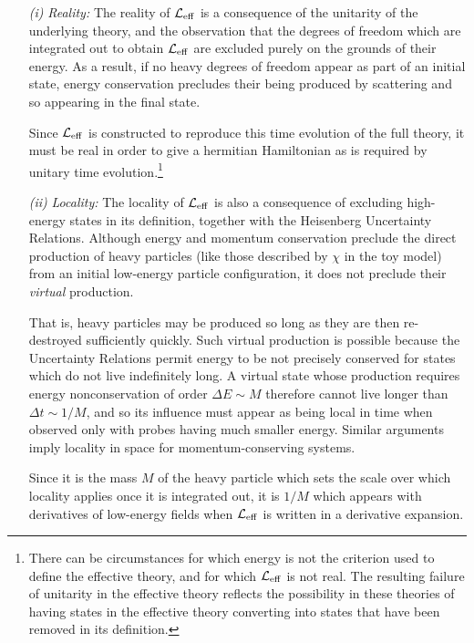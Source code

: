 \begin{itemize}
\item[{\it (i)}]
{\it Reality:} The reality of ${\cal L}_{\rm eff}$ 
is a consequence of the unitarity of the underlying
theory, and the observation that the degrees of 
freedom which are integrated out to obtain ${\cal L}_{\rm eff}$ 
are excluded purely on the grounds of their energy. As a
result, if no heavy degrees of freedom appear as part of an
initial state, energy conservation precludes their being produced
by scattering and so appearing in the final state. 

Since ${\cal L}_{\rm eff}$ is constructed to reproduce this
time evolution of the full theory, it must be real in order to
give a hermitian Hamiltonian as is required by unitary time
evolution.\footnote{There can be circumstances for which 
energy is not the criterion used to define the effective 
theory, and for which ${\cal L}_{\rm eff}$ is not real. The
resulting failure of unitarity in the effective theory
reflects the possibility in these theories of having states in 
the effective theory converting into states that have 
been removed in its definition.}

\item[{\it (ii)}] 
{\it Locality:} 
The locality of ${\cal L}_{\rm eff}$ is also a consequence 
of excluding high-energy states in its definition,
together with the Heisenberg Uncertainty Relations. Although
energy and momentum conservation preclude the
direct production of heavy particles (like those described by 
$\chi$ in the toy model) from an initial low-energy particle
configuration, it does not preclude their {\it virtual} production.

That is, heavy particles may be produced so long as they are
then re-destroyed sufficiently quickly. Such virtual production
is possible because the Uncertainty Relations permit 
energy to be not precisely conserved for states which do
not live indefinitely long. A virtual state whose production
requires energy nonconservation of order $\Delta E \sim 
M$ therefore cannot live longer than $\Delta t \sim 1/M$,
and so its influence must appear as being local in time
when observed only with probes having much smaller
energy. Similar arguments imply locality in space for 
momentum-conserving systems. 

Since it is the mass $M$ of the heavy particle which sets
the scale over which locality applies once it is integrated
out, it is $1/M$ which appears with derivatives of 
low-energy fields when ${\cal L}_{\rm eff}$ is written
in a derivative expansion.

\end{itemize}

